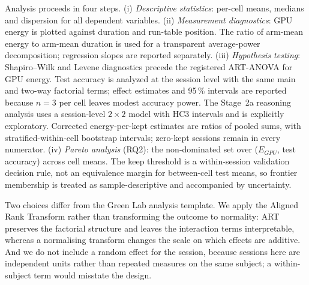 Analysis proceeds in four steps. (i) \emph{Descriptive statistics}: per-cell means, medians and dispersion for all dependent variables. (ii) \emph{Measurement diagnostics}: GPU energy is plotted against duration and run-table position. The ratio of arm-mean energy to arm-mean duration is used for a transparent average-power decomposition; regression slopes are reported separately. (iii) \emph{Hypothesis testing}: Shapiro--Wilk and Levene diagnostics precede the registered ART-ANOVA for GPU energy. Test accuracy is analyzed at the session level with the same main and two-way factorial terms; effect estimates and 95\,\% intervals are reported because $n=3$ per cell leaves modest accuracy power. The Stage~2a reasoning analysis uses a session-level $2\times2$ model with HC3 intervals and is explicitly exploratory. Corrected energy-per-kept estimates are ratios of pooled sums, with stratified-within-cell bootstrap intervals; zero-kept sessions remain in every numerator. (iv) \emph{Pareto analysis} (RQ2): the non-dominated set over ($E_{\mathit{GPU}}$, test accuracy) across cell means. The keep threshold is a within-session validation decision rule, not an equivalence margin for between-cell test means, so frontier membership is treated as sample-descriptive and accompanied by uncertainty.

Two choices differ from the Green Lab analysis template. We apply the Aligned Rank Transform \cite{wobbrock2011art} rather than transforming the outcome to normality: ART preserves the factorial structure and leaves the interaction terms interpretable, whereas a normalising transform changes the scale on which effects are additive. And we do not include a random effect for the session, because sessions here are independent units rather than repeated measures on the same subject; a within-subject term would misstate the design.
